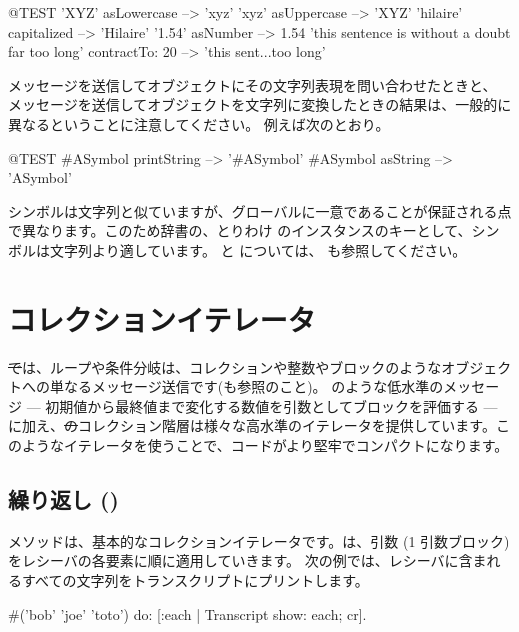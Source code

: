 \documentclass[a4paper,10pt,twoside]{book}
\begin{document}
\begin{code}{@TEST}
'XYZ' asLowercase --> 'xyz'
'xyz' asUppercase   --> 'XYZ'
'hilaire' capitalized   --> 'Hilaire'
'1.54' asNumber      --> 1.54
'this sentence is without a doubt far too long' contractTo: 20 --> 'this sent...too long'
\end{code}

 メッセージを送信してオブジェクトにその文字列表現を問い合わせたときと、 メッセージを送信してオブジェクトを文字列に変換したときの結果は、一般的に異なるということに注意してください。
例えば次のとおり。

\begin{code}{@TEST}
#ASymbol printString --> '#ASymbol'
#ASymbol asString    --> 'ASymbol'
\end{code}

シンボルは文字列と似ていますが、グローバルに一意であることが保証される点で異なります。このため辞書の、とりわけ  のインスタンスのキーとして、シンボルは文字列より適しています。
 と  については、 も参照してください。

\section{コレクションイテレータ}

\st では、ループや条件分岐は、コレクションや整数やブロックのようなオブジェクトへの単なるメッセージ送信です(も参照のこと)。 のような低水準のメッセージ --- 初期値から最終値まで変化する数値を引数としてブロックを評価する --- に加え、\st のコレクション階層は様々な高水準のイテレータを提供しています。このようなイテレータを使うことで、コードがより堅牢でコンパクトになります。

\subsection{繰り返し ()}
 メソッドは、基本的なコレクションイテレータです。は、引数 (1 引数ブロック)をレシーバの各要素に順に適用していきます。
次の例では、レシーバに含まれるすべての文字列をトランスクリプトにプリントします。

\begin{code}{}
#('bob' 'joe' 'toto') do: [:each | Transcript show: each; cr].
\end{code}
\end{document}
